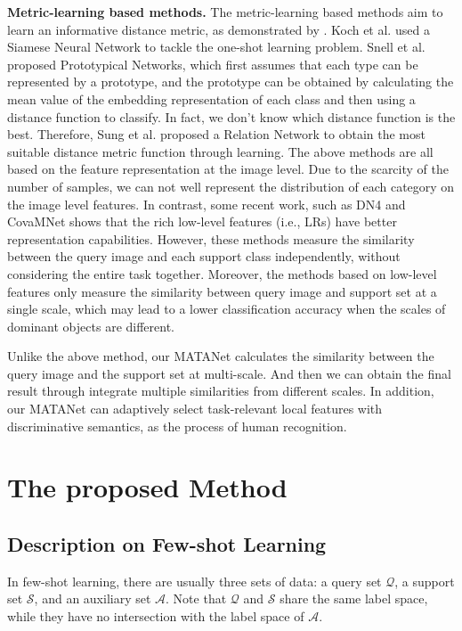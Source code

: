 \documentclass[final]{cvpr}
\begin{document}
	\textbf{Metric-learning based methods. }
	The metric-learning based methods aim to learn an informative distance metric, as demonstrated by \cite{vinyals2016matching,snell2017prototypical,sung2018learning,allen2019infinite,garcia2017few,li2019distribution,li2019revisiting,simon2020adaptive}.
	Koch et al. \cite{koch2015siamese} used a Siamese Neural Network to tackle the one-shot learning problem. Snell et al. \cite{snell2017prototypical} proposed Prototypical Networks, which first assumes that each type can be represented by a prototype, and the prototype can be obtained by calculating the mean value of the embedding representation of each class and then using a distance function to classify. In fact, we don't know which distance function is the best. Therefore, Sung et al. \cite{sung2018learning} proposed a Relation Network to obtain the most suitable distance metric function through learning. 
	The above methods are all based on the feature representation at the image level. Due to the scarcity of the number of samples, we can not well represent the distribution of each category on the image level features. In contrast, some recent work, such as DN4 \cite{li2019revisiting} and CovaMNet \cite{li2019distribution} shows that the rich low-level features (i.e., LRs) have better representation capabilities. However, these methods measure the similarity between the query image and each support class independently, without considering the entire task together. Moreover, the methods based on low-level features only measure the similarity between query image and support set at a single scale, which may lead to a lower classification accuracy when the scales of dominant objects are different. 
	
	Unlike the above method, our MATANet calculates the similarity between the query image and the support set at multi-scale. And then we can obtain the final result through integrate multiple similarities from different scales. In addition, our MATANet can adaptively select task-relevant local features with discriminative semantics, as the process of human recognition.
	
	
	\section{The proposed Method}
	
	\subsection{Description on Few-shot Learning}
	In few-shot learning, there are usually three sets of data: a query set $\mathcal{Q}$, a support set $\mathcal{S}$, and an auxiliary set $\mathcal{A}$. Note that $\mathcal{Q}$ and $\mathcal{S}$ share the same label space, while they have no intersection with the label space of $\mathcal{A}$. 
	
\end{document}
